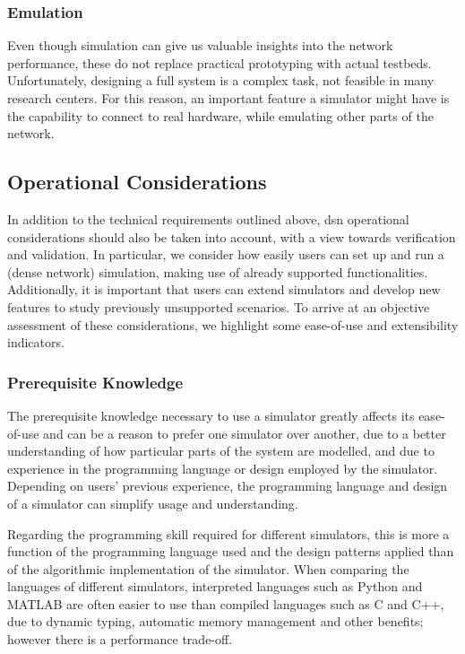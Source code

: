 \documentclass[conference]{IEEEtran}
\begin{document}
\subsubsection{Emulation} \label{subsect:Emulation}

Even though simulation can give us valuable insights into the network performance, these do not replace practical prototyping with actual
testbeds. Unfortunately, designing a full system is a complex task, not feasible in many research centers. For this reason, an important
feature a simulator might have is the capability to connect to real hardware, while emulating other parts of the network.

\subsection{Operational Considerations}

In addition to the technical requirements outlined above, \ac{dsn} operational considerations should also be taken into account, with a view towards verification and validation.
In particular, we consider how easily users can set up and run a (dense network) simulation, making use of already supported functionalities.
Additionally, it is important that users can extend simulators and develop new features to study previously unsupported scenarios. To arrive at an objective assessment of these considerations, we highlight some ease-of-use and extensibility indicators.

\subsubsection{Prerequisite Knowledge}

The prerequisite knowledge necessary to use a simulator greatly affects its ease-of-use and can be a reason to prefer one simulator over another, due to a better understanding of how particular parts of the system are modelled, and due to experience in the programming language or design employed by the simulator. Depending on users' previous experience, the programming language and design of a simulator can simplify usage and understanding.

Regarding the programming skill required for different simulators, this is more a function of the programming language used and the design patterns applied than of the algorithmic implementation of the simulator.
When comparing the languages of different simulators, interpreted languages such as Python and MATLAB are often easier to use than compiled languages such as C and C++, due to dynamic typing, automatic memory management and other benefits; however there is a performance trade-off.
\end{document}
